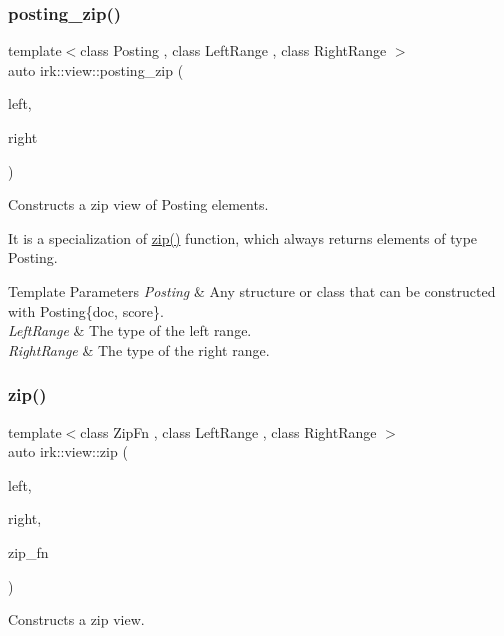\subsubsection{\texorpdfstring{posting\+\_\+zip()}{posting\_zip()}}
{\footnotesize\ttfamily template$<$class Posting , class Left\+Range , class Right\+Range $>$ \\
auto irk\+::view\+::posting\+\_\+zip (\begin{DoxyParamCaption}\item[{const Left\+Range \&}]{left,  }\item[{const Right\+Range \&}]{right }\end{DoxyParamCaption})}



Constructs a zip view of Posting elements. 

It is a specialization of \mbox{\hyperlink{namespaceirk_1_1view_a1375ca93181b0bcbc509d6b0bf6c5be9}{zip()}} function, which always returns elements of type {\ttfamily Posting}.


\begin{DoxyTemplParams}{Template Parameters}
{\em Posting} & Any structure or class that can be constructed with {\ttfamily Posting\{doc, score\}}. \\
\hline
{\em Left\+Range} & The type of the left range. \\
\hline
{\em Right\+Range} & The type of the right range. \\
\hline
\end{DoxyTemplParams}
\mbox{\label{namespaceirk_1_1view_a1375ca93181b0bcbc509d6b0bf6c5be9}} 
\subsubsection{\texorpdfstring{zip()}{zip()}}
{\footnotesize\ttfamily template$<$class Zip\+Fn , class Left\+Range , class Right\+Range $>$ \\
auto irk\+::view\+::zip (\begin{DoxyParamCaption}\item[{Left\+Range}]{left,  }\item[{Right\+Range}]{right,  }\item[{Zip\+Fn}]{zip\+\_\+fn }\end{DoxyParamCaption})}



Constructs a zip view. 


